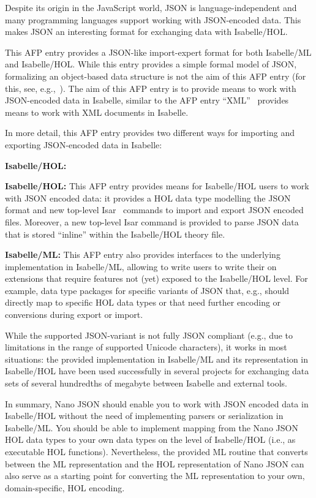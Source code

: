 \documentclass[11pt,DIV=12,a4paper,abstract=true,twoside=semi,openright]
{scrreprt}
\begin{document}
Despite its origin in the JavaScript world, JSON is language-independent and
many programming languages support working with JSON-encoded data. This makes
JSON an interesting format for exchanging data with Isabelle/HOL.
 
This AFP entry provides a JSON-like import-expert format for both Isabelle/ML
and Isabelle/HOL. While this entry provides a simple formal model of JSON,
formalizing an object-based data structure is not the aim of this AFP entry (for
this, see,
e.g.,~\cite{brucker.ea:extensible:2008-b,brucker.ea:afp-core-dom:2018}). The aim
of this AFP entry is to provide means to work with JSON-encoded data in
Isabelle, similar to the AFP entry ``XML''~\cite{sternagel.ea:xml:2014} provides
means to work with XML documents in Isabelle. 

In more detail, this AFP entry provides two different ways for importing and
exporting JSON-encoded data in Isabelle:
\begin{labeling}{\textbf{Isabelle/HOL:}}
\item[\textbf{Isabelle/HOL:}] This AFP entry provides means for Isabelle/HOL
      users to work with JSON encoded data: it provides a HOL data type
      modelling the JSON format and new top-level
      Isar~\cite{wenzel:isabelleisar:2002} commands to import and export JSON
      encoded files. Moreover, a new top-level Isar command is provided to parse
      JSON data that is stored ``inline'' within the Isabelle/HOL theory file. 
\item[\textbf{Isabelle/ML:}] This AFP entry also provides interfaces to the
      underlying implementation in Isabelle/ML, allowing to write users to
      write their on extensions that require features not (yet) exposed to the 
      Isabelle/HOL level. For example, data type packages for specific variants of JSON
      that, e.g., should directly map to specific HOL data types or that need
      further encoding or conversions during export or import. 
\end{labeling}

While the supported JSON-variant is not fully JSON compliant (e.g., due to
limitations in the range of supported Unicode characters), it works in most
situations: the provided implementation in Isabelle/ML and its representation in
Isabelle/HOL have been used successfully in several projects for exchanging data
sets of several hundredths of megabyte between Isabelle and external tools.


In summary, Nano JSON should enable you to work with JSON encoded data in Isabelle/HOL without
  the need of implementing parsers or serialization in Isabelle/ML. You should be able to implement
  mapping from the Nano JSON HOL data types to your own data types on the level of Isabelle/HOL (i.e., 
  as executable HOL functions). Nevertheless, the provided ML routine that converts between the 
  ML representation and the HOL representation of Nano JSON can also serve as a starting point 
  for converting the ML representation to your own, domain-specific, HOL encoding. 
\end{document}
